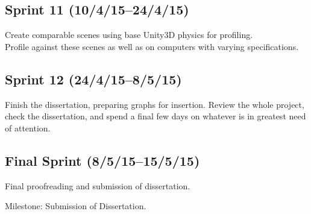 \subsection*{Sprint 11 (10/4/15--24/4/15)}

Create comparable scenes using base Unity3D physics for profiling.\\
Profile against these scenes as well as on computers with varying specifications.


\subsection*{Sprint 12 (24/4/15--8/5/15)}

Finish the dissertation, preparing graphs for insertion.  Review the whole
project, check the dissertation, and spend a final few days on
whatever is in greatest need of attention.


\subsection*{Final Sprint (8/5/15--15/5/15)}

Final proofreading and submission of dissertation.

Milestone: Submission of Dissertation. 
